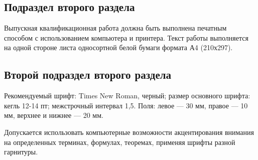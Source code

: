 \subsection{Подраздел второго раздела}

Выпускная квалификационная работа должна быть выполнена печатным способом с использованием компьютера и принтера. Текст работы выполняется на одной стороне листа односортной белой бумаги формата А4 (210х297).

\subsection{Второй подраздел второго раздела}

Рекомендуемый шрифт: Times New Roman, черный; размер основного шрифта: кегль 12-14 пт; межстрочный интервал 1,5. Поля: левое –-- 30 мм, правое --– 10 мм, верхнее и нижнее –-- 20 мм.

Допускается использовать компьютерные возможности акцентирования внимания на определенных терминах, формулах, теоремах, применяя шрифты разной гарнитуры.

